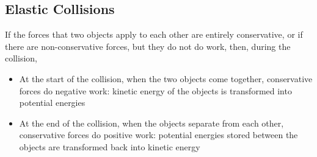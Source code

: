 \subsection{Elastic Collisions}
If the forces that two objects apply to each other are entirely conservative,
or if there are non-conservative forces, but they do not do work, then,
during the collision,
\begin{itemize}[itemsep=6pt]
\item At the start of the collision, when the two objects come together,
  conservative forces do negative work: kinetic energy of the objects is
  transformed into potential energies
\item At the end of the collision, when the objects separate from each
  other, conservative forces do positive work: potential energies stored
  between the objects are transformed back into kinetic energy
\end{itemize}

